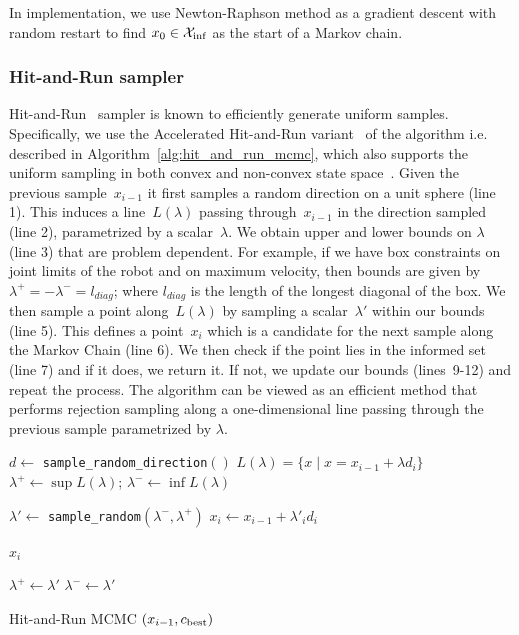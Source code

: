 \documentclass[letterpaper, 10 pt, conference]{ieeeconf}  %
\begin{document}
In implementation, we use Newton-Raphson method as a gradient descent with random restart to find $ x_0 \in \mathcal{X}_{\rm {inf}} $ as the start of a Markov chain.


\subsubsection{Hit-and-Run sampler}

Hit-and-Run~\cite{S84} sampler is known to efficiently generate uniform samples. 
Specifically, we use the Accelerated Hit-and-Run variant~\cite{KSZ11} of the algorithm i.e. described in Algorithm~\ref{alg:hit_and_run_mcmc}, which also supports the uniform sampling in both convex and non-convex state space~\cite{KSZ11}.
Given the previous sample~$x_{i-1}$ it first  samples a random direction on a unit sphere (line 1).
This induces a line~$L(\lambda)$ passing through~$x_{i-1}$ in the direction sampled (line 2), parametrized by a scalar~$\lambda$.
We obtain upper and lower bounds on $\lambda$ (line 3) that are problem dependent. 
For example, if we have box constraints on joint limits of the robot and on maximum velocity, then bounds are given by $\lambda^{+} = -\lambda^{-} = l_{diag}$; where $l_{diag}$ is the length of the longest diagonal of the box.
We then sample a point along~$L(\lambda)$ by sampling a scalar~$\lambda'$ within our bounds (line 5).
This defines a point~$x_{i}$ which is a candidate for the next sample along the Markov Chain (line 6).
We then check if the point lies in the informed set (line 7) and if it does, we return it.
If not, we update our bounds (lines~9-12) and repeat the process.
The algorithm can be viewed as an efficient method that performs rejection sampling along a one-dimensional line passing through the previous sample parametrized by $\lambda$.

\begin{algorithm}[t]
	\begin{algorithmic}[1]
		\STATE $d \leftarrow$ \texttt{sample\_random\_direction}$()$
		\STATE $ L(\lambda) = \{  x \mid x = x_{i-1} + \lambda d_i \} $
		\STATE $ \lambda^{+} \leftarrow \sup L(\lambda) $; 
		\hspace{3mm} 
		$ \lambda^{-} \leftarrow \inf L(\lambda) $
		
		\LOOP
		
		\STATE $ \lambda' \leftarrow$ \texttt{sample\_random}$ (\lambda^{-} , \lambda^{+})$
		\STATE $ x_{i} \leftarrow x_{i-1} + \lambda'_{i} d_i $
		
		\RETURN $ x_{i}$
		\ENDIF
		
		\STATE $ \lambda^{+} \leftarrow \lambda' $
		\ELSE
		\STATE $ \lambda^{-} \leftarrow \lambda'$
		\ENDIF
		
		\ENDLOOP
	\end{algorithmic}
	\caption{\captionstyle Hit-and-Run MCMC $(x_{i-1}, c_{\rm best})$}
	\label{alg:hit_and_run_mcmc}	
\end{algorithm}
\end{document}
